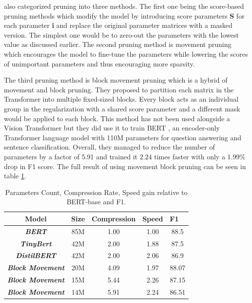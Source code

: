  also categorized pruning into three methods. The first one being the score-based pruning methods \cite{score-pruning} which modify the model by introducing score parameters \textbf{S} for each parameter \textbf{i} and replace the original parameter matrices with a masked version. The simplest one would be to zero-out the parameters with the lowest value as discussed earlier. The second pruning method is movement pruning which encourages the model to fine-tune the parameters while lowering the scores of unimportant parameters and thus encouraging more sparsity. 

The third pruning method is block movement pruning \cite{pruning-block} which is a hybrid of movement and block pruning. They proposed to partition each matrix in the Transformer into multiple fixed-sized blocks. Every block acts as an individual group in the regularization with a shared score parameter and a different mask would be applied to each block. This method has not been used alongside a Vision Transformer but they did use it to train BERT \cite{bert}, an encoder-only Transformer language model with 110M parameters for question answering and sentence classification. Overall, they managed to reduce the number of parameters by a factor of 5.91 and trained it $2.24$ times faster with only a 1.99\% drop in F1 score. The full result of using movement block pruning can be seen in table \ref{tab:block-movement}.
\FloatBarrier
\begin{table}[!h]
\centering
\begin{tabular}{|c|c|c|c|c|}
\hline
\textbf{Model}                   & \textbf{Size}               & \textbf{Compression}         & \multicolumn{1}{l|}{\textbf{Speed}} & \multicolumn{1}{l|}{\textbf{F1}} \\ \hline
\textit{\textbf{BERT}}           & \cellcolor[HTML]{FFFFFF}85M & \cellcolor[HTML]{FFFFFF}1.00 & \cellcolor[HTML]{FFFFFF}1.00        & \cellcolor[HTML]{FFFFFF}88.5     \\ \hline
\textit{\textbf{TinyBert}}       & \cellcolor[HTML]{FFFFFF}42M & \cellcolor[HTML]{FFFFFF}2.00 & \cellcolor[HTML]{FFFFFF}1.88        & \cellcolor[HTML]{FFFFFF}87.5     \\ \hline
\textit{\textbf{DistilBERT}}     & \cellcolor[HTML]{FFFFFF}42M & \cellcolor[HTML]{FFFFFF}2.00 & \cellcolor[HTML]{FFFFFF}2.06        & \cellcolor[HTML]{FFFFFF}86.9     \\ \hline
\textit{\textbf{Block Movement}} & \cellcolor[HTML]{FFFFFF}20M & \cellcolor[HTML]{FFFFFF}4.09 & \cellcolor[HTML]{FFFFFF}1.97        & \cellcolor[HTML]{FFFFFF}88.07    \\ \hline
\textit{\textbf{Block Movement}} & \cellcolor[HTML]{FFFFFF}15M & \cellcolor[HTML]{FFFFFF}5.44 & \cellcolor[HTML]{FFFFFF}2.26        & \cellcolor[HTML]{FFFFFF}87.15    \\ \hline
\textit{\textbf{Block Movement}} & \cellcolor[HTML]{FFFFFF}14M & \cellcolor[HTML]{FFFFFF}5.91 & \cellcolor[HTML]{FFFFFF}2.24        & \cellcolor[HTML]{FFFFFF}86.51    \\ \hline
\end{tabular}
\caption{Parameters Count, Compression Rate, Speed gain relative to BERT-base and F1.}
\label{tab:block-movement}
\end{table}
\FloatBarrier










